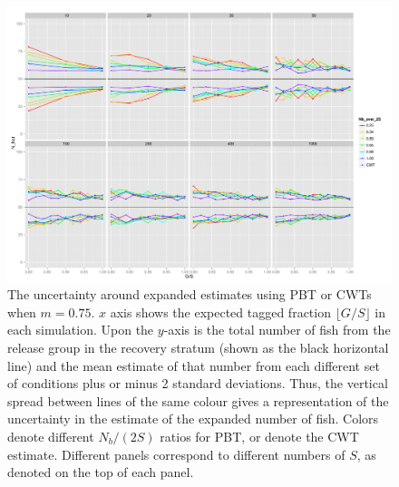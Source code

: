 \documentclass[11pt]{article}
\begin{document}
\begin{figure}
\includegraphics[width = .93\textwidth]{./images/sd_line_horns_m_0_75.pdf}
\caption{The uncertainty around expanded estimates using PBT or CWTs when $m = 0.75$.  $x$ axis shows the
expected tagged fraction $\lfloor G/S \rfloor$ in each simulation. Upon the $y$-axis is the total number of fish from the
release group in the recovery stratum (shown as the black horizontal line) and the mean estimate of that number from each different set of 
conditions plus or minus 2 standard deviations.  Thus, the vertical spread between lines of the same colour gives a representation
of the uncertainty in the estimate of the expanded number of fish. Colors denote different $N_b/(2S)$ ratios for PBT, or denote
the CWT estimate.  Different
panels correspond to different numbers of $S$, as denoted on the top of each panel.
\label{fig:horn0.75}}
\end{figure}
\end{document}
